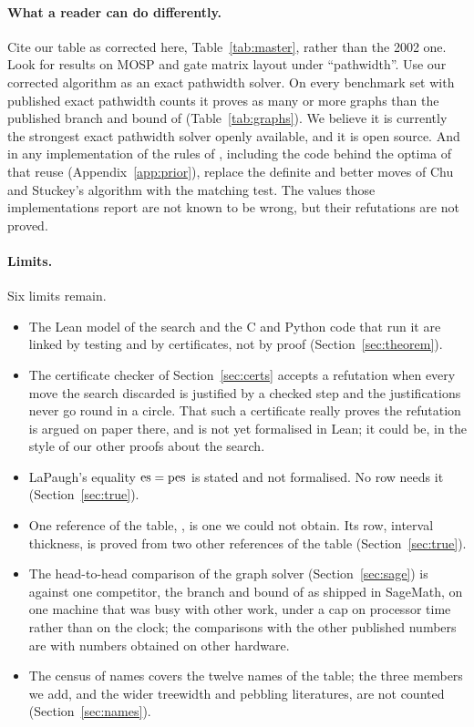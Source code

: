 \paragraph{What a reader can do differently.} Cite our table as corrected here,
Table~\ref{tab:master}, rather than the 2002 one. Look for results on MOSP and
gate matrix layout under ``pathwidth''. Use our corrected algorithm as an exact
pathwidth solver. On every benchmark set with published exact pathwidth counts
it proves as many or more graphs than the published branch and bound of
\citet{CoudertMazauricNisse2016} (Table~\ref{tab:graphs}). We believe it is
currently the strongest exact pathwidth solver openly available, and it is open
source. And in any implementation of the rules
of \citet{ChuStuckey2009}, including the code behind the optima of
\citet{Frinhani2018} that \citet{MartinYanassePinto2022} reuse
(Appendix~\ref{app:prior}), replace the definite and better moves of Chu and Stuckey's algorithm
with the matching test. The values those implementations report are not known
to be wrong, but their refutations are not proved.

\paragraph{Limits.} Six limits remain.
\begin{itemize}
\item The Lean model of the search and the C and Python code that run it are
  linked by testing and by certificates, not by proof
  (Section~\ref{sec:theorem}).
\item The certificate checker of Section~\ref{sec:certs} accepts a refutation
  when every move the search discarded is justified by a checked step and the
  justifications never go round in a circle. That such a certificate really
  proves the refutation is argued on paper there, and is not yet formalised in
  Lean; it could be, in the style of our other proofs about the search.
\item LaPaugh's equality $\mathrm{es}=\mathrm{pes}$ is stated and not formalised. No row
  needs it (Section~\ref{sec:true}).
\item One reference of the table, \citet{LY2002ref5}, is one we could not obtain. Its row,
  interval thickness, is proved from two other
  references of the table
  (Section~\ref{sec:true}).
\item The head-to-head comparison of the graph solver
  (Section~\ref{sec:sage}) is against one competitor, the branch and bound of
  \citet{CoudertMazauricNisse2016} as shipped in SageMath, on one machine that
  was busy with other work, under a cap on processor time rather than on the
  clock; the comparisons with the other published numbers are with numbers
  obtained on other hardware.
\item The census of names covers the twelve names of the table; the three
  members we add, and the wider treewidth and pebbling literatures, are not
  counted (Section~\ref{sec:names}).
\end{itemize}

